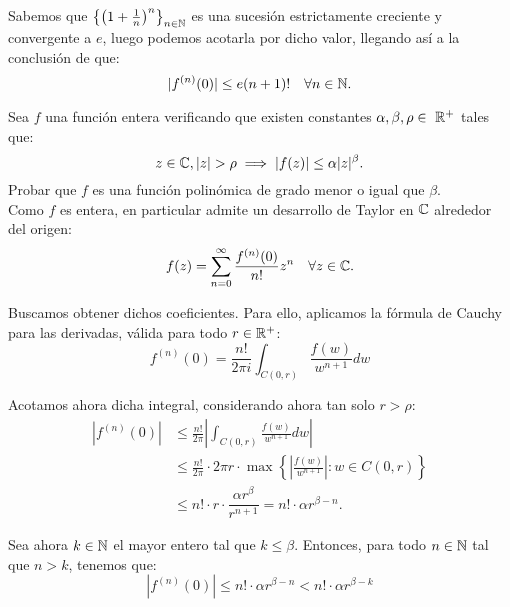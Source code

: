 \begin{ejercicio}
    Sabemos que $\left\{\left(1+\frac{1}{n}\right)^n\right\}_{n\in \mathbb{N}}$ es una sucesión estrictamente creciente y convergente a $e$, luego podemos acotarla por dicho valor, llegando así a la conclusión de que:
    \begin{equation*}
        |f^{(n)}(0)|\leq e(n+1)! \quad \forall n\in \mathbb{N}.
    \end{equation*}
\end{ejercicio}

\begin{ejercicio}\label{ej:9.2}
    Sea $f$ una función entera verificando que existen constantes $\alpha,\beta,\rho\in~\mathbb{R}^+$ tales que:
    \begin{equation*}
        z\in \bb{C}, |z|>\rho \implies |f(z)|\leq \alpha |z|^\beta.
    \end{equation*}
    Probar que $f$ es una función polinómica de grado menor o igual que $\beta$.\\

    Como $f$ es entera, en particular admite un desarrollo de Taylor en $\mathbb{C}$ alrededor del origen:
    \begin{equation*}
        f(z)=\sum_{n=0}^{\infty} \dfrac{f^{(n)}(0)}{n!} z^n \quad \forall z\in \mathbb{C}.
    \end{equation*}

    Buscamos obtener dichos coeficientes. Para ello, aplicamos la fórmula de Cauchy para las derivadas, válida para todo $r\in \mathbb{R}^+$:
    \begin{equation*}
        f^{(n)}(0)=\frac{n!}{2\pi i} \int_{C(0,r)} \frac{f(w)}{w^{n+1}} dw
    \end{equation*}

    Acotamos ahora dicha integral, considerando ahora tan solo $r>\rho$:
    \begin{align*}
        |f^{(n)}(0)| &\leq \frac{n!}{2\pi} \left| \int_{C(0,r)} \frac{f(w)}{w^{n+1}} dw \right| \\
        &\leq \frac{n!}{2\pi}\cdot 2\pi r\cdot \max\left\{ \left| \frac{f(w)}{w^{n+1}} \right| : w\in C(0,r) \right\} \\
        &\leq n!\cdot r\cdot \dfrac{\alpha r^\beta}{r^{n+1}} = n!\cdot \alpha r^{\beta-n}.
    \end{align*}

    Sea ahora $k\in \mathbb{N}$ el mayor entero tal que $k\leq \beta$. Entonces, para todo $n\in \mathbb{N}$ tal que $n>k$, tenemos que:
    \begin{equation*}
        |f^{(n)}(0)|\leq n!\cdot \alpha r^{\beta-n}<n!\cdot \alpha r^{\beta-k}
    \end{equation*}


\end{ejercicio}
